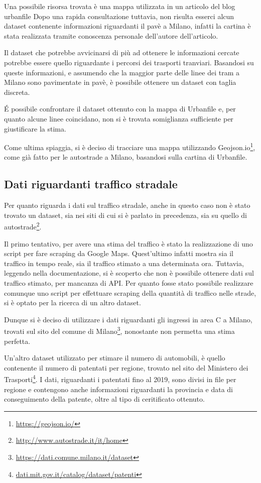\documentclass[a4paper]{report}
\begin{document}
Una possibile risorsa trovata è una mappa utilizzata in un articolo del blog urbanfile \cite{URBANFILE:1}
Dopo una rapida consultazione tuttavia, non risulta esserci alcun dataset contenente informazioni 
riguardanti il pavè a Milano, infatti la cartina è stata realizzata tramite conoscenza personale dell'autore dell'articolo.

Il dataset che potrebbe avvicinarsi di più ad ottenere le informazioni cercate potrebbe essere 
quello riguardante i percorsi dei trasporti tranviari. Basandosi su queste informazioni, e assumendo che 
la maggior parte delle linee dei tram a Milano sono pavimentate in pavè, è possibile ottenere un dataset con taglia discreta.

\'E possibile confrontare il dataset ottenuto con la mappa di Urbanfile e, 
per quanto alcune linee coincidano, non si è trovata somiglianza sufficiente 
per giustificare la stima.

Come ultima spiaggia, si è deciso di tracciare una mappa utilizzando 
Geojson.io\footnote{\url{https://geojson.io/}}, come già fatto per le autostrade a Milano, 
basandosi sulla cartina di Urbanfile. 

\subsection{Dati riguardanti traffico stradale}
Per quanto riguarda i dati sul traffico stradale, anche in questo caso non è stato trovato un 
dataset, sia nei siti di cui si è parlato in precedenza, sia su quello di 
autostrade\footnote{\url{http://www.autostrade.it/it/home}}.

Il primo tentativo, per avere una stima del traffico è stato la realizzazione di uno script per 
fare scraping da Google Maps. Quest'ultimo infatti mostra sia il traffico in tempo reale, sia 
il traffico stimato a una determinata ora. Tuttavia, leggendo nella documentazione, si è scoperto che 
non è possibile ottenere dati sul traffico stimato, per mancanza di API. 
Per quanto fosse stato possibile realizzare comunque uno script per effettuare scraping della 
quantità di traffico nelle strade, si è optato per la ricerca di un altro dataset.

Dunque si è deciso di utilizzare i dati riguardanti gli ingressi in area C a Milano, 
trovati sul sito del comune di Milano\footnote{\url{https://dati.comune.milano.it/dataset}}, 
nonostante non permetta una stima perfetta.

Un'altro dataset utilizzato per stimare il numero di automobili, è quello contenente 
il numero di patentati per regione, trovato nel sito del Ministero dei 
Trasporti\footnote{\url{dati.mit.gov.it/catalog/dataset/patenti}}.
I dati, riguardanti i patentati fino al 2019, sono divisi in file per regione e 
contengono anche informazioni riguardanti la provincia e data di conseguimento della 
patente, oltre al tipo di ceritificato ottenuto.
\end{document}
